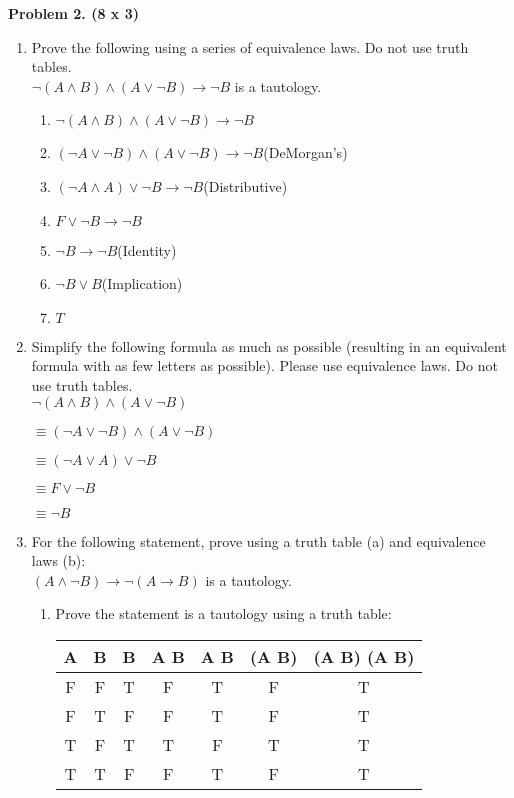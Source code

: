 \documentclass[12pt,twoside]{article}
\begin{document}

\newpage
\textbf{Problem 2. (8 x 3)}
\begin{enumerate}
    \item Prove the following using a series of equivalence laws. Do not use truth tables.
    \\$\neg (A \land B) \land (A \lor \neg B) \rightarrow \neg B$ is a tautology.
	\begin{enumerate}
		\item $\lnot(A \land B) \land (A \lor \lnot B) \to \lnot B$
		\item $(\lnot A \lor \lnot B) \land (A \lor \lnot B) \to \lnot B$\hfill(DeMorgan's)
		\item $(\lnot A \land A) \lor \lnot B \to \lnot B$\hfill(Distributive)
		\item $F \lor \lnot B \to \lnot B$
		\item $\lnot B \to \lnot B$\hfill(Identity)
		\item $\lnot B \lor B$\hfill(Implication)
		\item $T$
	\end{enumerate}


    \clearpage
    \item Simplify the following formula as much as possible (resulting in an equivalent formula with as few letters as possible). Please use equivalence laws. Do not use truth tables.\\
    $\neg (A \land B) \land (A \lor \neg B)$

	$\equiv (\lnot A \lor \lnot B) \land (A \lor \lnot B)$

	$\equiv (\lnot A \lor A) \lor \lnot B$

	$\equiv F \lor \lnot B$

	$\equiv \lnot B$


\newpage



    \item
For the following statement, prove using a truth table (a) and equivalence laws (b):
\\$(A \land \neg B) \rightarrow \neg (A \rightarrow B)$ is a tautology.
\begin{enumerate}
    \item Prove the statement is a tautology using a truth table:

	\begin{tabular}{|c|c|c|c|c|c|c|}
		\hline A & B & \lnot B & A \land \lnot B & A \to B & \lnot(A \to B) & (A \land \lnot B) \to \lnot(A \to B) \\
		\hline F & F & T & F & T & F & T \\
		\hline F & T & F & F & T & F & T \\
		\hline T & F & T & T & F & T & T \\
		\hline T & T & F & F & T & F & T \\
		\hline


\end{tabular}
\end{enumerate}
\end{enumerate}
\end{document}
